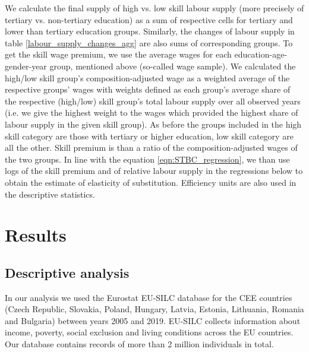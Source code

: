 \documentclass{article}
\begin{document}
We calculate the final supply of high vs. low skill labour supply (more precisely of tertiary vs. non-tertiary education) as a sum of respective cells for tertiary and lower than tertiary education groups. Similarly, the changes of labour supply in table \ref{labour_supply_changes_agg} are also sums of corresponding groups.
To get the skill wage premium, we use the average wages for each education-age-gender-year group, mentioned above (so-called wage sample). We calculated the high/low skill group's composition-adjusted wage as a weighted average of the respective groups' wages with weights defined as each group's average share of the respective (high/low) skill group's total labour supply over all observed years (i.e. we give the highest weight to the wages which provided the highest share of labour supply in the given skill group). As before the groups included in the high skill category are those with tertiary or higher education, low skill category are all the other. Skill premium is than a ratio of the composition-adjusted wages of the two groups. 
In line with the equation \ref{eqn:STBC_regression}, we than use logs of the skill premium and of relative labour supply in the regressions below to obtain the estimate of elasticity of substitution. Efficiency units are also used in the descriptive statistics.


\section{Results}
\subsection{Descriptive analysis}
In our analysis we used the Eurostat EU-SILC database for the CEE countries (Czech Republic, Slovakia, Poland, Hungary, Latvia, Estonia, Lithuania, Romania and Bulgaria) between years 2005 and 2019. EU-SILC collects information about income, poverty, social exclusion and living conditions across the EU countries. Our database contains records of more than 2 million individuals in total.
\end{document}
